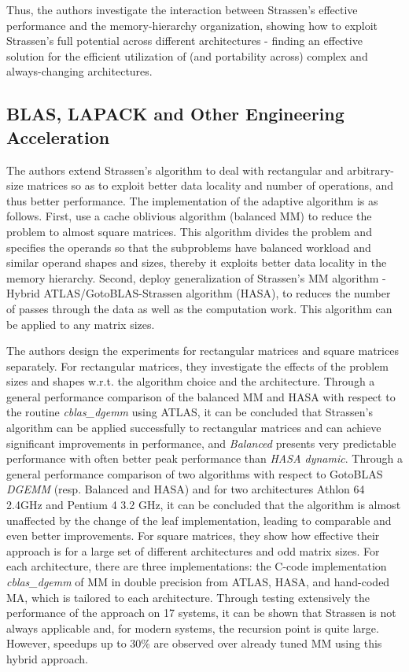 \documentclass[UTF8]{ctexart}
\begin{document}
Thus, the authors investigate the interaction between Strassen's effective performance and the memory-hierarchy organization, showing how to exploit Strassen's full potential across different architectures - finding an effective solution for the efficient utilization of (and portability across) complex and always-changing architectures.

\subsection{BLAS, LAPACK and Other Engineering Acceleration}
\label{subsec::BLAaOEAc}
The authors extend Strassen's algorithm to deal with rectangular and arbitrary-size matrices so as to exploit better data locality and number of operations, and thus better performance. The implementation of the adaptive algorithm is as follows. First, use a cache oblivious algorithm (balanced MM) to reduce the problem to almost square matrices. This algorithm divides the problem and specifies the operands so that the subproblems have balanced workload and similar operand shapes and sizes, thereby it exploits better data locality in the memory hierarchy. Second, deploy generalization of Strassen's MM algorithm - Hybrid ATLAS/GotoBLAS-Strassen algorithm (HASA), to reduces the number of passes through the data as well as the computation work. This algorithm can be applied to any matrix sizes.

The authors design the experiments for rectangular matrices and square matrices separately. For rectangular matrices, they investigate the effects of the problem sizes and shapes w.r.t. the algorithm choice and the architecture. Through a general performance comparison of the balanced MM and HASA with respect to the routine \textit{cblas\_dgemm} using ATLAS, it can be concluded that Strassen's algorithm can be applied successfully to rectangular matrices and can achieve significant improvements in performance, and \textit{Balanced} presents very predictable performance with often better peak performance than \textit{HASA dynamic}. Through a general performance comparison of two algorithms with respect to GotoBLAS \textit{DGEMM} (resp. Balanced and HASA) and for two architectures Athlon 64 2.4GHz and Pentium 4 3.2 GHz, it can be concluded that the algorithm is almost unaffected by the change of the leaf implementation, leading to comparable and even better improvements. For square matrices, they show how effective their approach is for a large set of different architectures and odd matrix sizes. For each architecture, there are three implementations: the C-code implementation \textit{cblas\_dgemm} of MM in double precision from ATLAS, HASA, and hand-coded MA, which is tailored to each architecture. Through testing extensively the performance of the approach on 17 systems, it can be shown that Strassen is not always applicable and, for modern systems, the recursion point is quite large. However, speedups up to 30\% are observed over already tuned MM using this hybrid approach.
\end{document}
